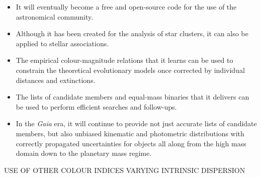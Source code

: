 \begin{itemize}
\item It will eventually become a free and open-source code for the use of the astronomical community.
\item Although it has been created for the analysis of star clusters, it can also be applied to stellar associations.
\item The empirical colour-magnitude relations that it learns can be used to constrain the theoretical evolutionary models once corrected by individual distances and extinctions.
\item The lists of candidate members and equal-mass binaries that it delivers can be used to perform efficient searches and follow-ups.
\item In the \emph{Gaia} era, it will continue to provide not just accurate lists of candidate members, but also unbiased kinematic and photometric distributions with correctly propagated uncertainties for objects all along from the high mass domain down to the planetary mass regime.
\end{itemize}

USE OF OTHER COLOUR INDICES
VARYING INTRINSIC DISPERSION







